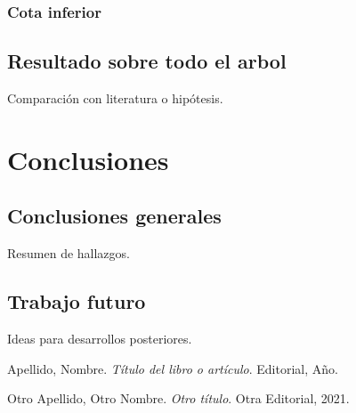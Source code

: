 \documentclass[12pt]{report}
\begin{document}
\subsection{Cota inferior}



\section{Resultado sobre todo el arbol}
Comparación con literatura o hipótesis.

\chapter{Conclusiones}
\section{Conclusiones generales}
Resumen de hallazgos.

\section{Trabajo futuro}
Ideas para desarrollos posteriores.

\begin{thebibliography}{9}
Apellido, Nombre. \textit{Título del libro o artículo}. Editorial, Año.

Otro Apellido, Otro Nombre. \textit{Otro título}. Otra Editorial, 2021.
\end{thebibliography}
\end{document}
